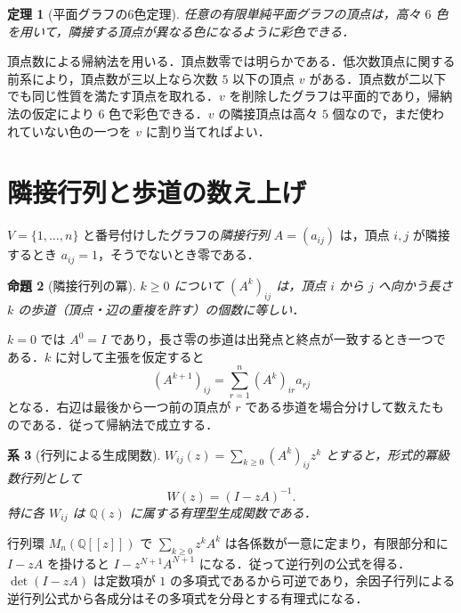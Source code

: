 \documentclass[a5paper,10pt,onecolumn]{jsarticle}
\makeatletter
\theoremstyle{mathnotetheorem}
\newtheorem{theorem}{定理}[section]
\newtheorem{proposition}[theorem]{命題}
\newtheorem{corollary}[theorem]{系}
\renewcommand{\proofname}{証明}
\renewenvironment{proof}[1][\proofname]{%
  \par\pushQED{\qed}\normalfont\topsep4\p@\@plus2\p@\relax
  \trivlist\item[\hskip\labelsep\bfseries #1]\ignorespaces
}{\popQED\endtrivlist\@endpefalse}
\makeatother
\begin{document}
\begin{theorem}[平面グラフの6色定理]
任意の有限単純平面グラフの頂点は，高々 $6$ 色を用いて，隣接する頂点が異なる色になるように彩色できる．
\end{theorem}
\begin{proof}
頂点数による帰納法を用いる．頂点数零では明らかである．低次数頂点に関する前系により，頂点数が三以上なら次数 $5$ 以下の頂点 $v$ がある．頂点数が二以下でも同じ性質を満たす頂点を取れる．$v$ を削除したグラフは平面的であり，帰納法の仮定により $6$ 色で彩色できる．$v$ の隣接頂点は高々 $5$ 個なので，まだ使われていない色の一つを $v$ に割り当てればよい．
\end{proof}

\section{隣接行列と歩道の数え上げ}
$V=\{1,\dots,n\}$ と番号付けしたグラフの\emph{隣接行列} $A=(a_{ij})$ は，頂点 $i,j$ が隣接するとき $a_{ij}=1$，そうでないとき零である．
\begin{proposition}[隣接行列の冪]
$k\ge0$ について $(A^k)_{ij}$ は，頂点 $i$ から $j$ へ向かう長さ $k$ の歩道（頂点・辺の重複を許す）の個数に等しい．
\end{proposition}
\begin{proof}
$k=0$ では $A^0=I$ であり，長さ零の歩道は出発点と終点が一致するとき一つである．$k$ に対して主張を仮定すると
\[
 (A^{k+1})_{ij}=\sum_{r=1}^n(A^k)_{ir}a_{rj}
\]
となる．右辺は最後から一つ前の頂点が $r$ である歩道を場合分けして数えたものである．従って帰納法で成立する．
\end{proof}

\begin{corollary}[行列による生成関数]
$W_{ij}(z)=\sum_{k\ge0}(A^k)_{ij}z^k$ とすると，形式的冪級数行列として
\[
 W(z)=(I-zA)^{-1}.
\]
特に各 $W_{ij}$ は $\mathbb Q(z)$ に属する有理型生成関数である．
\end{corollary}
\begin{proof}
行列環 $M_n(\mathbb Q[[z]])$ で $\sum_{k\ge0}z^kA^k$ は各係数が一意に定まり，有限部分和に $I-zA$ を掛けると $I-z^{N+1}A^{N+1}$ になる．従って逆行列の公式を得る．$\det(I-zA)$ は定数項が $1$ の多項式であるから可逆であり，余因子行列による逆行列公式から各成分はその多項式を分母とする有理式になる．
\end{proof}
\end{document}
